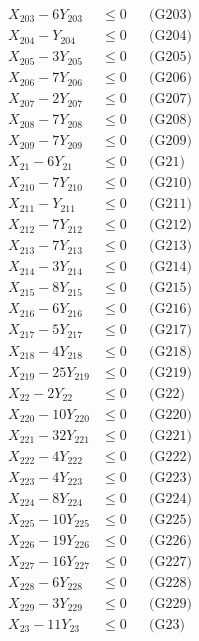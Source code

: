 \documentclass[a4paper,10pt]{article}
\begin{document}
{\begin{align}
X_{203} - 6Y_{203} &\leq 0 && \text{(G203)} \\
X_{204} - Y_{204} &\leq 0 && \text{(G204)} \\
X_{205} - 3Y_{205} &\leq 0 && \text{(G205)} \\
\allowbreak
X_{206} - 7Y_{206} &\leq 0 && \text{(G206)} \\
X_{207} - 2Y_{207} &\leq 0 && \text{(G207)} \\
X_{208} - 7Y_{208} &\leq 0 && \text{(G208)} \\
X_{209} - 7Y_{209} &\leq 0 && \text{(G209)} \\
X_{21} - 6Y_{21} &\leq 0 && \text{(G21)} \\
X_{210} - 7Y_{210} &\leq 0 && \text{(G210)} \\
X_{211} - Y_{211} &\leq 0 && \text{(G211)} \\
X_{212} - 7Y_{212} &\leq 0 && \text{(G212)} \\
X_{213} - 7Y_{213} &\leq 0 && \text{(G213)} \\
X_{214} - 3Y_{214} &\leq 0 && \text{(G214)} \\
X_{215} - 8Y_{215} &\leq 0 && \text{(G215)} \\
X_{216} - 6Y_{216} &\leq 0 && \text{(G216)} \\
X_{217} - 5Y_{217} &\leq 0 && \text{(G217)} \\
X_{218} - 4Y_{218} &\leq 0 && \text{(G218)} \\
X_{219} - 25Y_{219} &\leq 0 && \text{(G219)} \\
X_{22} - 2Y_{22} &\leq 0 && \text{(G22)} \\
X_{220} - 10Y_{220} &\leq 0 && \text{(G220)} \\
X_{221} - 32Y_{221} &\leq 0 && \text{(G221)} \\
X_{222} - 4Y_{222} &\leq 0 && \text{(G222)} \\
X_{223} - 4Y_{223} &\leq 0 && \text{(G223)} \\
\allowbreak
X_{224} - 8Y_{224} &\leq 0 && \text{(G224)} \\
X_{225} - 10Y_{225} &\leq 0 && \text{(G225)} \\
X_{226} - 19Y_{226} &\leq 0 && \text{(G226)} \\
X_{227} - 16Y_{227} &\leq 0 && \text{(G227)} \\
X_{228} - 6Y_{228} &\leq 0 && \text{(G228)} \\
X_{229} - 3Y_{229} &\leq 0 && \text{(G229)} \\
X_{23} - 11Y_{23} &\leq 0 && \text{(G23)} \\

\end{align}}
\end{document}
